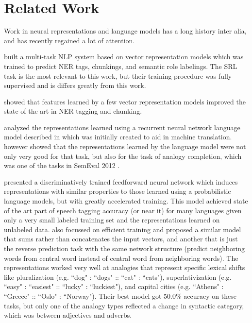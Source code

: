 \documentclass[11pt,letterpaper]{article}
\begin{document}
\section{Related Work} %
Work in neural representations and language models has a long history
\cite{foundation1,foundation2,foundation3} inter alia,
and has recently regained a lot of attention.


\cite{DBLP:conf/icml/CollobertW08} built a multi-task NLP system based
on vector representation models which was trained to predict NER tags,
chunkings, and semantic role labelings. The SRL task is the most relevant
to this work, but their training procedure was fully supervised and
is differs greatly from this work.

\cite{turian} showed that features learned by
a few vector representation models improved the state of the art in NER tagging and chunking.


\cite{MikolovYZ13} analyzed the representations learned using
	a recurrent neural network language model described in \cite{DBLP:conf/interspeech/KombrinkMKB11}
which was initially created to aid in machine translation.
\cite{MikolovYZ13} however showed that the representations learned by the
language model were not only very good for that task, but also for the
task of analogy completion, which was one of the tasks in SemEval 2012 \cite{semeval2012}.

\cite{rami} presented a discriminatively trained feedforward neural network
which induces representations with similar properties to those learned using
a probabilistic language models, but with greatly accelerated training.
This model achieved state of the art part of speech tagging accuracy (or near it)
for many languages given only a very small labeled training set and the representations
learned on unlabeled data.
\cite{DBLP:journals/corr/abs-1301-3781} also focussed on efficient training and
proposed a similar model that sums rather than concatenates the input vectors,
and another that is just the reverse prediction task with the same network structure
(predict neighboring words from central word instead of central word from neighboring words).
The representations worked very well at analogies that represent specific lexical shifts
like pluralization (e.g. ``dog" : ``dogs" :: ``cat" : ``cats"), superlativization
(e.g. ``easy" : ``easiest" :: ``lucky" : ``luckiest"), and
capital cities (e.g. ``Athens" : ``Greece" :: ``Oslo" : ``Norway").
Their best model got 50.0\% accuracy on these tasks, but only one of the analogy types
reflected a change in syntactic category, which was between adjectives and adverbs.
\end{document}
